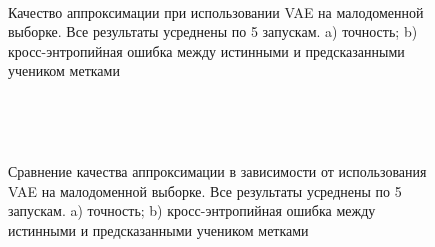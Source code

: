 \begin{figure}[h!t]\center
{}
\\
\caption{Качество аппроксимации при использовании VAE на малодоменной выборке. Все результаты усреднены по 5 запускам. a) точность; b) кросс-энтропийная ошибка между истинными и предсказанными учеником метками}
\end{figure}\\

\begin{figure}[h!t]\center
{}
\\
\caption{Сравнение качества аппроксимации в зависимости от использования VAE на малодоменной выборке. Все результаты усреднены по 5 запускам. a) точность; b) кросс-энтропийная ошибка между истинными и предсказанными учеником метками}
\end{figure}

